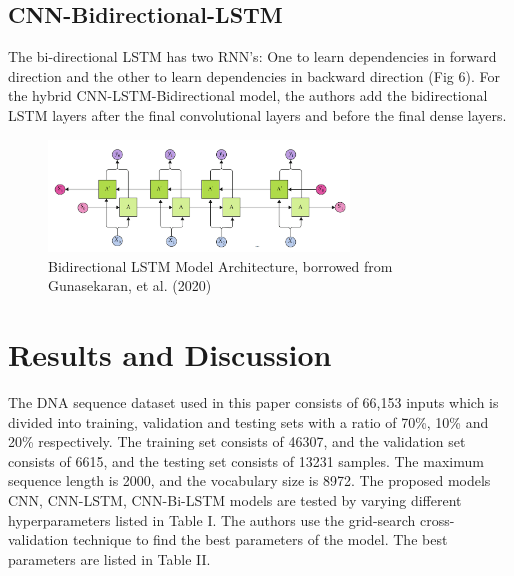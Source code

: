 \documentclass[journal]{IEEEtran}
\begin{document}

\subsection{CNN-Bidirectional-LSTM}
The bi-directional LSTM has two RNN’s: One to learn dependencies in forward direction and the other to 
learn dependencies in backward direction (Fig 6). For the hybrid CNN-LSTM-Bidirectional model, the authors add the bidirectional LSTM layers
after the final convolutional layers and before the final dense layers.

\begin{figure}
  \centering
  \includegraphics[width=8cm]{figures/bi_lstm_cell.png}
  \caption{Bidirectional LSTM Model Architecture, borrowed from Gunasekaran, et al. (2020)}
\end{figure}

\section{Results and Discussion}
The DNA sequence dataset used in this paper consists of 66,153 inputs which is divided into training, 
validation and testing sets with a ratio of 70\%, 10\% and 20\% respectively.
The training set consists of 46307, and the validation set consists of 6615, and the testing set consists of 13231 samples. 
The maximum sequence length is 2000, and the vocabulary size is 8972. 
The proposed models CNN, CNN-LSTM, CNN-Bi-LSTM models are tested by varying different hyperparameters listed in Table I. 
The authors use the grid-search cross-validation technique to find the best parameters of the model.
The best parameters are listed in Table II.
\end{document}
